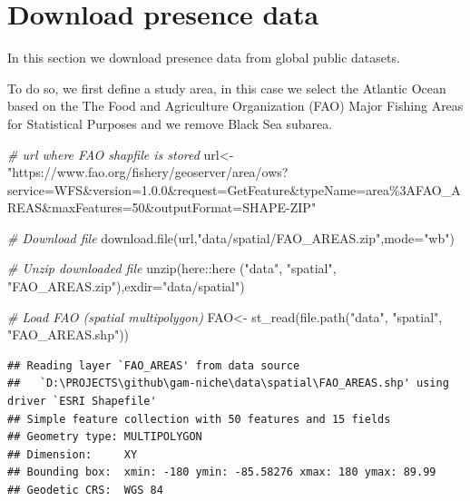 \documentclass[
]{book}
\newenvironment{Shaded}{\begin{snugshade}}{\end{snugshade}}
\newcommand{\AttributeTok}[1]{\textcolor[rgb]{0.77,0.63,0.00}{#1}}
\newcommand{\CommentTok}[1]{\textcolor[rgb]{0.56,0.35,0.01}{\textit{#1}}}
\newcommand{\FunctionTok}[1]{\textcolor[rgb]{0.00,0.00,0.00}{#1}}
\newcommand{\NormalTok}[1]{#1}
\newcommand{\OtherTok}[1]{\textcolor[rgb]{0.56,0.35,0.01}{#1}}
\newcommand{\SpecialCharTok}[1]{\textcolor[rgb]{0.00,0.00,0.00}{#1}}
\newcommand{\StringTok}[1]{\textcolor[rgb]{0.31,0.60,0.02}{#1}}
\begin{document}
\hypertarget{download-presence-data}{%
\section{Download presence data}\label{download-presence-data}}

In this section we download presence data from global public datasets.

To do so, we first define a study area, in this case we select the Atlantic Ocean based on the The Food and Agriculture Organization (FAO) Major Fishing Areas for Statistical Purposes and we remove Black Sea subarea.

\begin{Shaded}
\begin{Highlighting}[]
\CommentTok{\# url where FAO shapfile is stored}
\NormalTok{url}\OtherTok{\textless{}{-}}\StringTok{"https://www.fao.org/fishery/geoserver/area/ows?service=WFS\&version=1.0.0\&request=GetFeature\&typeName=area\%3AFAO\_AREAS\&maxFeatures=50\&outputFormat=SHAPE{-}ZIP"}

\CommentTok{\# Download file}
\FunctionTok{download.file}\NormalTok{(url,}\StringTok{"data/spatial/FAO\_AREAS.zip"}\NormalTok{,}\AttributeTok{mode=}\StringTok{"wb"}\NormalTok{)}

\CommentTok{\# Unzip downloaded file}
\FunctionTok{unzip}\NormalTok{(here}\SpecialCharTok{::}\FunctionTok{here}\NormalTok{ (}\StringTok{"data"}\NormalTok{, }\StringTok{"spatial"}\NormalTok{, }\StringTok{"FAO\_AREAS.zip"}\NormalTok{),}\AttributeTok{exdir=}\StringTok{"data/spatial"}\NormalTok{)}

\CommentTok{\# Load FAO (spatial multipolygon)}
\NormalTok{FAO}\OtherTok{\textless{}{-}} \FunctionTok{st\_read}\NormalTok{(}\FunctionTok{file.path}\NormalTok{(}\StringTok{"data"}\NormalTok{, }\StringTok{"spatial"}\NormalTok{, }\StringTok{"FAO\_AREAS.shp"}\NormalTok{))}
\end{Highlighting}
\end{Shaded}

\begin{verbatim}
## Reading layer `FAO_AREAS' from data source 
##   `D:\PROJECTS\github\gam-niche\data\spatial\FAO_AREAS.shp' using driver `ESRI Shapefile'
## Simple feature collection with 50 features and 15 fields
## Geometry type: MULTIPOLYGON
## Dimension:     XY
## Bounding box:  xmin: -180 ymin: -85.58276 xmax: 180 ymax: 89.99
## Geodetic CRS:  WGS 84
\end{verbatim}
\end{document}

